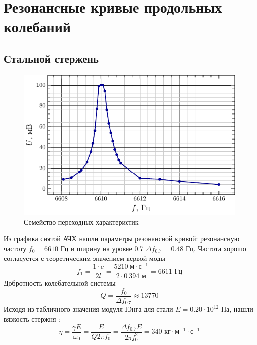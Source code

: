 
\newpage

\section{Резонансные кривые продольных колебаний}
\subsection{Стальной стержень}

\begin{figure}[H]
	\centering
	\includegraphics[scale=1.5]{fig/steel_afc.pdf}
	\vspace{-1em}
	\caption{Семейство переходных характеристик}
	\label{fig:2}
\end{figure}
Из графика снятой АЧХ нашли параметры резонансной кривой: резонансную частоту
$f_0=6610\text{ Гц}$ и ширину на уровне 0.7 $\Delta f_{0.7} = 0.48\text{ Гц}$. 
Частота хорошо согласуется с теоретическим значением первой моды
\begin{equation}
	f_1 = \frac{1\cdot c}{2l} = \frac{5210 \text{ м}\cdot\text{с}^{-1}}{2\cdot 0.394\text{ м}}=6611 \text{ Гц}
\end{equation}
Добротность колебательной системы
\begin{equation}
	Q = \frac{f_0}{\Delta f_{0.7}} \approx 13770
\end{equation}
Исходя из табличного значения модуля Юнга для стали $E=0.20\cdot10^{12}$ Па, нашли вязкость стержня  \cite[стр. 10]{met}:
\begin{equation}
	\eta = \frac{\gamma E}{\omega_0} = \frac{ E}{Q 2\pi f_0} = \frac{\Delta f_{0.7} E}{2\pi f_0^2} = 340 \text{ кг}\cdot\text{м}^{-1}\cdot\text{с}^{-1}
\end{equation}

